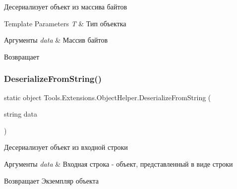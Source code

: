 Десериализует объект из массива байтов 


\begin{DoxyTemplParams}{Template Parameters}
{\em T} & Тип объектка\\
\hline
\end{DoxyTemplParams}

\begin{DoxyParams}{Аргументы}
{\em data} & Массив байтов\\
\hline
\end{DoxyParams}
\begin{DoxyReturn}{Возвращает}

\end{DoxyReturn}
\mbox{\label{class_tools_1_1_extensions_1_1_object_helper_a2dd94da1024292cb58b13470fa6098ea}} 
\subsubsection{\texorpdfstring{Deserialize\+From\+String()}{DeserializeFromString()}}
{\footnotesize\ttfamily static object Tools.\+Extensions.\+Object\+Helper.\+Deserialize\+From\+String (\begin{DoxyParamCaption}\item[{string}]{data }\end{DoxyParamCaption})\hspace{0.3cm}{\ttfamily [static]}}



Десериализует объект из входной строки 


\begin{DoxyParams}{Аргументы}
{\em data} & Входная строка -\/ объект, представленный в виде строки\\
\hline
\end{DoxyParams}
\begin{DoxyReturn}{Возвращает}
Экземпляр объекта
\end{DoxyReturn}
\mbox{\label{class_tools_1_1_extensions_1_1_object_helper_a504eb45071b2c1ed166f7901d8f24b4f}} 
